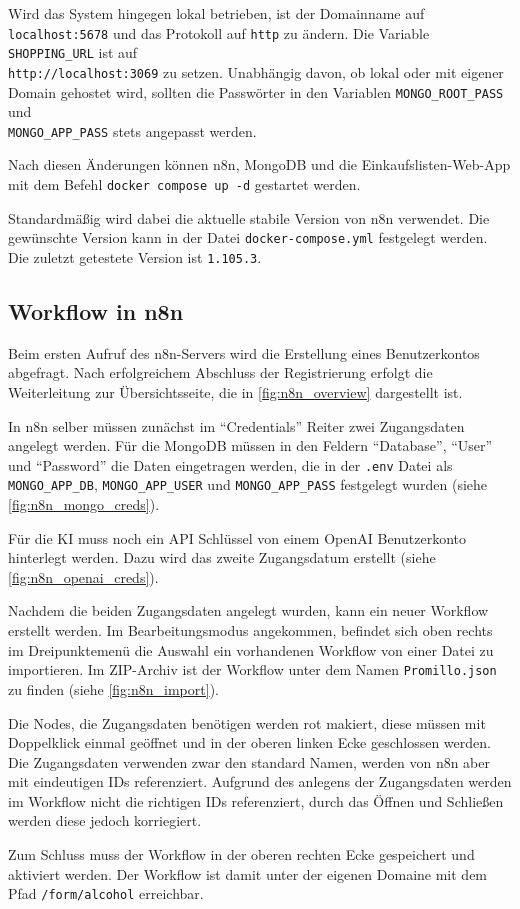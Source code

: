 Wird das System hingegen lokal betrieben, ist der Domainname auf \verb|localhost:5678| und das
Protokoll auf \verb|http| zu ändern. Die Variable \verb|SHOPPING_URL| ist auf \\
\verb|http://localhost:3069| zu setzen. Unabhängig davon, ob lokal oder mit eigener Domain gehostet
wird, sollten die Passwörter in den Variablen \verb|MONGO_ROOT_PASS| und \\
\verb|MONGO_APP_PASS| stets angepasst werden.

Nach diesen Änderungen können n8n, MongoDB und die Einkaufslisten-Web-App mit dem Befehl
\verb|docker compose up -d| gestartet werden.

Standardmäßig wird dabei die aktuelle stabile Version von n8n verwendet. Die gewünschte Version kann
in der Datei \verb|docker-compose.yml| festgelegt werden. Die zuletzt getestete Version ist
\verb|1.105.3|.

\subsection{Workflow in n8n}\label{sub:workflow_in_n_n} %
Beim ersten Aufruf des n8n-Servers wird die Erstellung eines Benutzerkontos abgefragt. Nach
erfolgreichem Abschluss der Registrierung erfolgt die Weiterleitung zur Übersichtsseite, die in
\autoref{fig:n8n_overview} dargestellt ist.

In n8n selber müssen zunächst im \enquote{Credentials} Reiter zwei Zugangsdaten angelegt werden. Für
die MongoDB müssen in den Feldern \enquote{Database}, \enquote{User} und \enquote{Password} die Daten
eingetragen werden, die in der \verb|.env| Datei als \verb|MONGO_APP_DB|, \verb|MONGO_APP_USER| und
\verb|MONGO_APP_PASS| festgelegt wurden (siehe \autoref{fig:n8n_mongo_creds}).

Für die KI muss noch ein API Schlüssel von einem OpenAI Benutzerkonto hinterlegt werden. Dazu wird
das zweite Zugangsdatum erstellt (siehe \autoref{fig:n8n_openai_creds}).

Nachdem die beiden Zugangsdaten angelegt wurden, kann ein neuer Workflow erstellt werden. Im
Bearbeitungsmodus angekommen, befindet sich oben rechts im Dreipunktemenü die Auswahl ein
vorhandenen Workflow von einer Datei zu importieren. Im ZIP-Archiv ist der Workflow unter dem Namen
\verb|Promillo.json| zu finden (siehe \autoref{fig:n8n_import}).

Die Nodes, die Zugangsdaten benötigen werden rot makiert, diese müssen mit Doppelklick einmal
geöffnet und in der oberen linken Ecke geschlossen werden. Die Zugangsdaten verwenden zwar den
standard Namen, werden von n8n aber mit eindeutigen IDs referenziert. Aufgrund des anlegens der
Zugangsdaten werden im Workflow nicht die richtigen IDs referenziert, durch das Öffnen und Schließen
werden diese jedoch korriegiert.

Zum Schluss muss der Workflow in der oberen rechten Ecke gespeichert und aktiviert werden. Der
Workflow ist damit unter der eigenen Domaine mit dem Pfad \verb|/form/alcohol| erreichbar.
